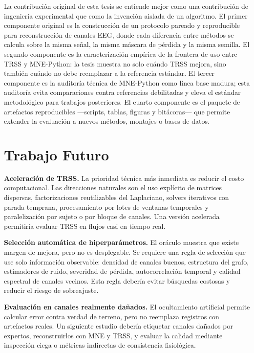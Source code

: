 La contribución original de esta tesis se entiende mejor como una contribución de ingeniería experimental que como la invención aislada de un algoritmo. El primer componente original es la construcción de un protocolo pareado y reproducible para reconstrucción de canales EEG, donde cada diferencia entre métodos se calcula sobre la misma señal, la misma máscara de pérdida y la misma semilla. El segundo componente es la caracterización empírica de la frontera de uso entre TRSS y MNE-Python: la tesis muestra no solo cuándo TRSS mejora, sino también cuándo no debe reemplazar a la referencia estándar. El tercer componente es la auditoría técnica de MNE-Python como línea base madura; esta auditoría evita comparaciones contra referencias debilitadas y eleva el estándar metodológico para trabajos posteriores. El cuarto componente es el paquete de artefactos reproducibles —scripts, tablas, figuras y bitácoras— que permite extender la evaluación a nuevos métodos, montajes o bases de datos.

\section{Trabajo Futuro}

\textbf{Aceleración de TRSS.} La prioridad técnica más inmediata es reducir el costo computacional. Las direcciones naturales son el uso explícito de matrices dispersas, factorizaciones reutilizables del Laplaciano, solvers iterativos con parada temprana, procesamiento por lotes de ventanas temporales y paralelización por sujeto o por bloque de canales. Una versión acelerada permitiría evaluar TRSS en flujos casi en tiempo real.

\textbf{Selección automática de hiperparámetros.} El oráculo muestra que existe margen de mejora, pero no es desplegable. Se requiere una regla de selección que use solo información observable: densidad de canales buenos, estructura del grafo, estimadores de ruido, severidad de pérdida, autocorrelación temporal y calidad espectral de canales vecinos. Esta regla debería evitar búsquedas costosas y reducir el riesgo de sobreajuste.

\textbf{Evaluación en canales realmente dañados.} El ocultamiento artificial permite calcular error contra verdad de terreno, pero no reemplaza registros con artefactos reales. Un siguiente estudio debería etiquetar canales dañados por expertos, reconstruirlos con MNE y TRSS, y evaluar la calidad mediante inspección ciega o métricas indirectas de consistencia fisiológica.

